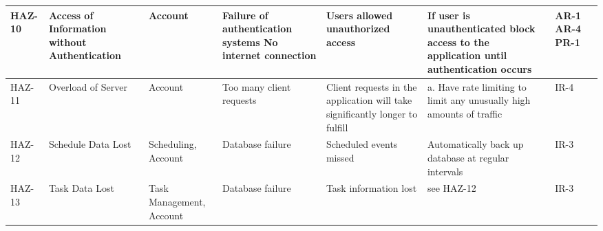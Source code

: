 \documentclass{article}
\begin{document}
\begin{center}
\begin{longtable}{|p{1.5cm}|p{2cm}|p{2cm}|p{3cm}|p{3.5cm}|p{4cm}|p{1cm}|p{1cm}|}
HAZ-10 & Access of Information without Authentication & Account & Failure of authentication systems \newline No internet connection  & Users allowed unauthorized access & If user is unauthenticated block access to the application until authentication occurs & AR-1 \newline AR-4 \newline PR-1 \\ \hline
HAZ-11 & Overload of Server & Account &  Too many client requests & Client requests in the application will take significantly longer to fulfill & a. Have rate limiting to limit any unusually high amounts of traffic  & IR-4 \\ \hline
HAZ-12 & Schedule Data Lost & Scheduling, Account &  Database failure  & Scheduled events missed & Automatically back up database at regular intervals & IR-3 \\ \hline
HAZ-13 & Task Data Lost &  Task Management, Account &  Database failure  & Task information lost  & see HAZ-12 & IR-3\\ \hline

\end{longtable}
\end{center}




\end{document}
